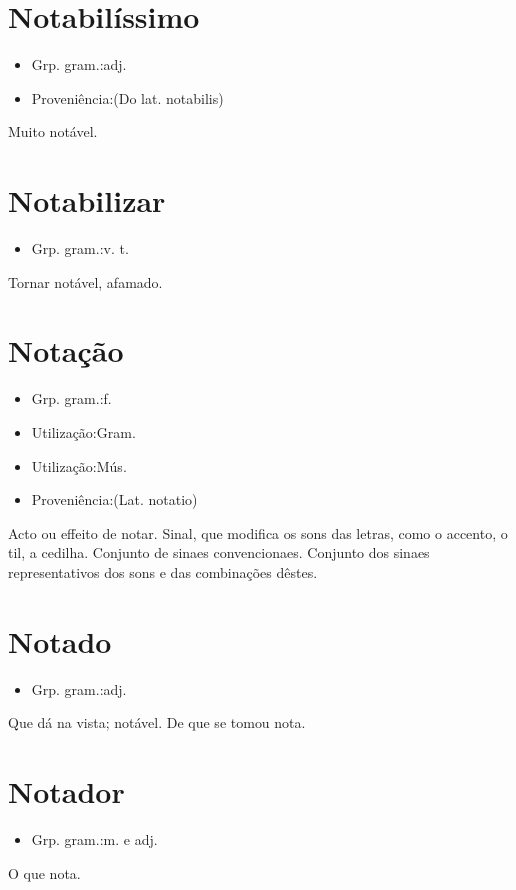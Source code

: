\section{Notabilíssimo}
\begin{itemize}
\item {Grp. gram.:adj.}
\end{itemize}
\begin{itemize}
\item {Proveniência:(Do lat. \textunderscore notabilis\textunderscore )}
\end{itemize}
Muito notável.
\section{Notabilizar}
\begin{itemize}
\item {Grp. gram.:v. t.}
\end{itemize}
Tornar notável, afamado.
\section{Notação}
\begin{itemize}
\item {Grp. gram.:f.}
\end{itemize}
\begin{itemize}
\item {Utilização:Gram.}
\end{itemize}
\begin{itemize}
\item {Utilização:Mús.}
\end{itemize}
\begin{itemize}
\item {Proveniência:(Lat. \textunderscore notatio\textunderscore )}
\end{itemize}
Acto ou effeito de notar.
Sinal, que modifica os sons das letras, como o accento, o til, a cedilha.
Conjunto de sinaes convencionaes.
Conjunto dos sinaes representativos dos sons e das combinações dêstes.
\section{Notado}
\begin{itemize}
\item {Grp. gram.:adj.}
\end{itemize}
Que dá na vista; notável.
De que se tomou nota.
\section{Notador}
\begin{itemize}
\item {Grp. gram.:m.  e  adj.}
\end{itemize}
O que nota.
